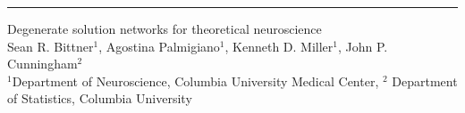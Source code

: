 \documentclass[landscape]{article}
\begin{document}
\color{black}

\hrule width 0pt depth 0pt height 1pt

\begin{center}
  \titleSize
Degenerate solution networks for theoretical neuroscience \\
  \HUGE %
  Sean R. Bittner$^{1}$, Agostina Palmigiano$^1$, Kenneth D. Miller$^1$, John P. Cunningham$^2$ \\
  \huge
  $^{1}$Department of Neuroscience, Columbia University Medical Center,  $^{2}$ Department of Statistics, Columbia University
\end{center}


\vspace{.5in}
\end{document}
